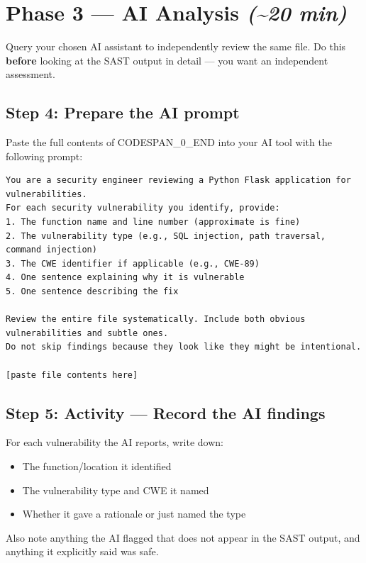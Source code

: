\documentclass[11pt,a4paper]{book}
\begin{document}
\medskip

\section{Phase 3 --- AI Analysis \textit{(\textasciitilde{}20 min)}}

Query your chosen AI assistant to independently review the same file. Do this \textbf{before} looking at the SAST output in detail --- you want an independent assessment.

\subsection{Step 4: Prepare the AI prompt}

Paste the full contents of CODESPAN\_0\_END into your AI tool with the following prompt:

\begin{lstlisting}
You are a security engineer reviewing a Python Flask application for vulnerabilities.
For each security vulnerability you identify, provide:
1. The function name and line number (approximate is fine)
2. The vulnerability type (e.g., SQL injection, path traversal, command injection)
3. The CWE identifier if applicable (e.g., CWE-89)
4. One sentence explaining why it is vulnerable
5. One sentence describing the fix

Review the entire file systematically. Include both obvious vulnerabilities and subtle ones.
Do not skip findings because they look like they might be intentional.

[paste file contents here]
\end{lstlisting}

\subsection{Step 5: Activity --- Record the AI findings}

For each vulnerability the AI reports, write down:
\begin{itemize}
  \item The function/location it identified
  \item The vulnerability type and CWE it named
  \item Whether it gave a rationale or just named the type
\end{itemize}

Also note anything the AI flagged that does not appear in the SAST output, and anything it explicitly said was safe.
\end{document}

